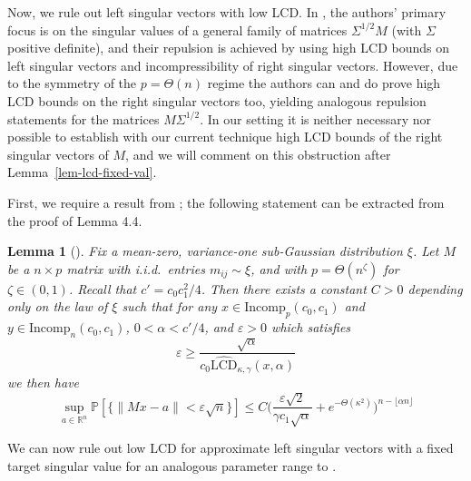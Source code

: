 \documentclass[11pt]{article}
\numberwithin{equation}{section}
\newtheorem{lemma}[theorem]{Lemma}
\theoremstyle{remark}
\newcommand{\R}{\mathbb{R}}
\newcommand{\Incomp}{\mathrm{Incomp}}
\newcommand{\rLCD}{\widehat{\mathrm{LCD}}}
\begin{document}
Now, we rule out left singular vectors with low LCD. In \cite{christoffersen2025gaps}, the authors' primary focus is on the singular values of a general family of matrices $\Sigma^{1/2}M$ (with $\Sigma$ positive definite), and their repulsion is achieved by using high LCD bounds on left singular vectors and incompressibility of right singular vectors. However, due to the symmetry of the $p = \Theta(n)$ regime the authors can and do prove high LCD bounds on the right singular vectors too, yielding analogous repulsion statements for the matrices $M \Sigma^{1/2}$. In our setting it is neither necessary nor possible to establish with our current technique high LCD bounds of the right singular vectors of $M$, and we will comment on this obstruction after Lemma~\ref{lem-lcd-fixed-val}. 

First, we require a result from \cite{christoffersen2025gaps}; the following statement can be extracted from the proof of Lemma 4.4.

\begin{lemma}[{\cite[Half of Lemma 4.4]{christoffersen2025gaps}}]\label{lem-approx-singular}
    Fix a mean-zero, variance-one sub-Gaussian distribution $\xi$. Let $M$ be a $n \times p$ matrix with i.i.d.\ entries $m_{ij} \sim \xi$, and with $p = \Theta(n^{\zeta})$ for $\zeta \in (0, 1)$. Recall that $c' = c_0 c_1^2/4$. Then there exists a constant $C > 0$ depending only on the law of $\xi$ such that for any $x \in \Incomp_p(c_{0}, c_{1})$ and $y \in \Incomp_n(c_{0}, c_{1})$, $0 < \alpha < c'/4$, and $\varepsilon > 0$ which satisfies
    \begin{equation*}
        \varepsilon \geq \frac{\sqrt{\alpha}}{c_0 \rLCD_{\kappa, \gamma}(x, \alpha)}
    \end{equation*}
    we then have
    \begin{equation*}
        \sup_{a \in \R^n}\mathbb{P}[ \{\|Mx - a\| < \varepsilon \sqrt{n}\}] \leq C\bigg(\frac{\varepsilon\sqrt{2}}{\gamma c_{1} \sqrt{\alpha}} + e^{-\Theta(\kappa^2)} \bigg)^{n - \lfloor \alpha n \rfloor}
    \end{equation*}
\end{lemma}
We can now rule out low LCD for approximate left singular vectors with a fixed target singular value for an analogous parameter range to \cite{christoffersen2025gaps}.
\end{document}
